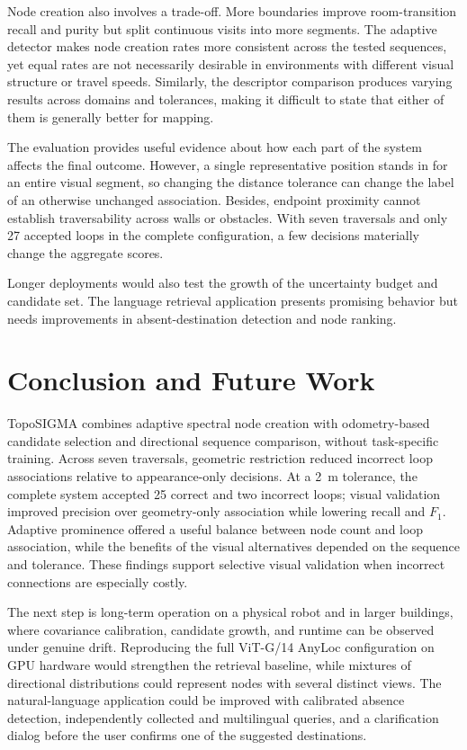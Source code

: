 \documentclass[5p,twocolumn,nonatbib,reversenotenum]{elsarticle}
\newcommand{\methodname}{TopoSIGMA\xspace}
\begin{document}
Node creation also involves a trade-off. More boundaries improve room-transition recall and purity but split continuous visits into more segments. The adaptive detector makes node creation rates more consistent across the tested sequences, yet equal rates are not necessarily desirable in environments with different visual structure or travel speeds. Similarly, the descriptor comparison produces varying results across domains and tolerances, making it difficult to state that either of them is generally better for mapping.

The evaluation provides useful evidence about how each part of the system affects the final outcome. However, a single representative position stands in for an entire visual segment, so changing the distance tolerance can change the label of an otherwise unchanged association. Besides, endpoint proximity cannot establish traversability across walls or obstacles. With seven traversals and only 27 accepted loops in the complete configuration, a few decisions materially change the aggregate scores.

Longer deployments would also test the growth of the uncertainty budget and candidate set. The language retrieval application presents promising behavior but needs improvements in absent-destination detection and node ranking.

\section{Conclusion and Future Work}
\methodname combines adaptive spectral node creation with odometry-based candidate selection and directional sequence comparison, without task-specific training. Across seven traversals, geometric restriction reduced incorrect loop associations relative to appearance-only decisions. At a \qty{2}{\metre} tolerance, the complete system accepted 25 correct and two incorrect loops; visual validation improved precision over geometry-only association while lowering recall and $F_1$. Adaptive prominence offered a useful balance between node count and loop association, while the benefits of the visual alternatives depended on the sequence and tolerance. These findings support selective visual validation when incorrect connections are especially costly.

The next step is long-term operation on a physical robot and in larger buildings, where covariance calibration, candidate growth, and runtime can be observed under genuine drift. Reproducing the full ViT-G/14 AnyLoc configuration on GPU hardware would strengthen the retrieval baseline, while mixtures of directional distributions could represent nodes with several distinct views. The natural-language application could be improved with calibrated absence detection, independently collected and multilingual queries, and a clarification dialog before the user confirms one of the suggested destinations.
\end{document}
